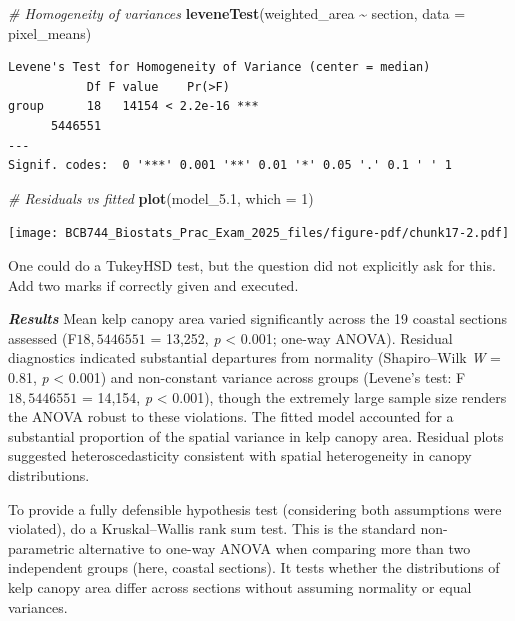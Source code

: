 \documentclass[
  british,
  10pt,
]{article}
\newenvironment{Shaded}{\begin{snugshade}}{\end{snugshade}}
\newcommand{\AttributeTok}[1]{\textcolor[rgb]{0.13,0.29,0.53}{#1}}
\newcommand{\CommentTok}[1]{\textcolor[rgb]{0.56,0.35,0.01}{\textit{#1}}}
\newcommand{\DecValTok}[1]{\textcolor[rgb]{0.00,0.00,0.81}{#1}}
\newcommand{\FloatTok}[1]{\textcolor[rgb]{0.00,0.00,0.81}{#1}}
\newcommand{\FunctionTok}[1]{\textcolor[rgb]{0.13,0.29,0.53}{\textbf{#1}}}
\newcommand{\NormalTok}[1]{#1}
\newcommand{\SpecialCharTok}[1]{\textcolor[rgb]{0.81,0.36,0.00}{\textbf{#1}}}
\let\oldtexttt\texttt
\renewcommand{\texttt}[1]{\oldtexttt{\small #1}}
\begin{document}
\begin{Shaded}
\begin{Highlighting}[]
\CommentTok{\# Homogeneity of variances}
\FunctionTok{leveneTest}\NormalTok{(weighted\_area }\SpecialCharTok{\textasciitilde{}}\NormalTok{ section, }\AttributeTok{data =}\NormalTok{ pixel\_means)}
\end{Highlighting}
\end{Shaded}

\begin{verbatim}
Levene's Test for Homogeneity of Variance (center = median)
           Df F value    Pr(>F)    
group      18   14154 < 2.2e-16 ***
      5446551                      
---
Signif. codes:  0 '***' 0.001 '**' 0.01 '*' 0.05 '.' 0.1 ' ' 1
\end{verbatim}

\begin{Shaded}
\begin{Highlighting}[]
\CommentTok{\# Residuals vs fitted}
\FunctionTok{plot}\NormalTok{(model\_5}\FloatTok{.1}\NormalTok{, }\AttributeTok{which =} \DecValTok{1}\NormalTok{)}
\end{Highlighting}
\end{Shaded}

\begin{center}
\texttt{[image: BCB744\_Biostats\_Prac\_Exam\_2025\_files/figure-pdf/chunk17-2.pdf]}
\end{center}

One could do a TukeyHSD test, but the question did not explicitly ask
for this. Add two marks if correctly given and executed.

\textbf{\emph{Results}} Mean kelp canopy area varied significantly
across the 19 coastal sections assessed (F\({18,5446551}\) = 13,252,
\emph{p} \textless{} 0.001; one-way ANOVA). Residual diagnostics
indicated substantial departures from normality (Shapiro--Wilk \emph{W}
= 0.81, \emph{p} \textless{} 0.001) and non-constant variance across
groups (Levene's test: F\({18,5446551}\) = 14,154, \emph{p} \textless{}
0.001), though the extremely large sample size renders the ANOVA robust
to these violations. The fitted model accounted for a substantial
proportion of the spatial variance in kelp canopy area. Residual plots
suggested heteroscedasticity consistent with spatial heterogeneity in
canopy distributions.

To provide a fully defensible hypothesis test (considering both
assumptions were violated), do a Kruskal--Wallis rank sum test. This is
the standard non-parametric alternative to one-way ANOVA when comparing
more than two independent groups (here, coastal sections). It tests
whether the distributions of kelp canopy area differ across sections
without assuming normality or equal variances.
\end{document}
